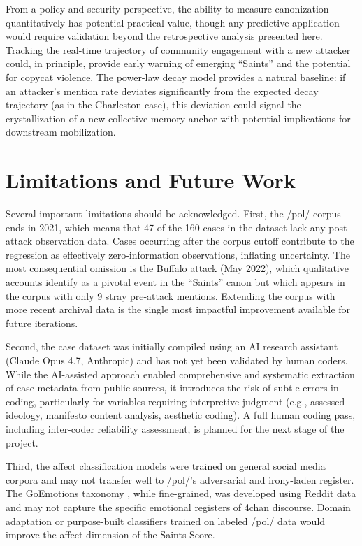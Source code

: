 \documentclass[12pt]{article}
\begin{document}
From a policy and security perspective, the ability to measure canonization quantitatively has potential practical value, though any predictive application would require validation beyond the retrospective analysis presented here. Tracking the real-time trajectory of community engagement with a new attacker could, in principle, provide early warning of emerging ``Saints'' and the potential for copycat violence. The power-law decay model provides a natural baseline: if an attacker's mention rate deviates significantly from the expected decay trajectory (as in the Charleston case), this deviation could signal the crystallization of a new collective memory anchor with potential implications for downstream mobilization.

\section{Limitations and Future Work}

Several important limitations should be acknowledged. First, the /pol/ corpus ends in 2021, which means that 47 of the 160 cases in the dataset lack any post-attack observation data. Cases occurring after the corpus cutoff contribute to the regression as effectively zero-information observations, inflating uncertainty. The most consequential omission is the Buffalo attack (May 2022), which qualitative accounts identify as a pivotal event in the ``Saints'' canon \parencite{kupper2023going} but which appears in the corpus with only 9 stray pre-attack mentions. Extending the corpus with more recent archival data is the single most impactful improvement available for future iterations.

Second, the case dataset was initially compiled using an AI research assistant (Claude Opus 4.7, Anthropic) and has not yet been validated by human coders. While the AI-assisted approach enabled comprehensive and systematic extraction of case metadata from public sources, it introduces the risk of subtle errors in coding, particularly for variables requiring interpretive judgment (e.g., assessed ideology, manifesto content analysis, aesthetic coding). A full human coding pass, including inter-coder reliability assessment, is planned for the next stage of the project.

Third, the affect classification models were trained on general social media corpora and may not transfer well to /pol/'s adversarial and irony-laden register. The GoEmotions taxonomy \parencite{demszky2020goemotions}, while fine-grained, was developed using Reddit data and may not capture the specific emotional registers of 4chan discourse. Domain adaptation or purpose-built classifiers trained on labeled /pol/ data would improve the affect dimension of the Saints Score.
\end{document}
